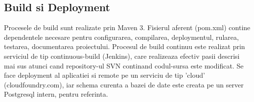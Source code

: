 \subsection{Build si Deployment}
Procesele de build sunt realizate prin Maven 3. Fisierul aferent (pom.xml)
contine dependentele necesare pentru configurarea, compilarea,
deploymentul, rularea, testarea, documentarea proiectului.
Procesul de build continuu este realizat prin 
serviciul de tip continuous-build (Jenkins), 
care realizeaza efectiv pasii descrisi mai sus 
atunci cand repository-ul SVN continand codul-sursa este modificat. 
Se face deployment al aplicatiei si remote pe un
serviciu de tip 'cloud' (cloudfoundry.com), 
iar schema curenta a bazei de date este creata pe un server Postgresql intern,
pentru referinta.
